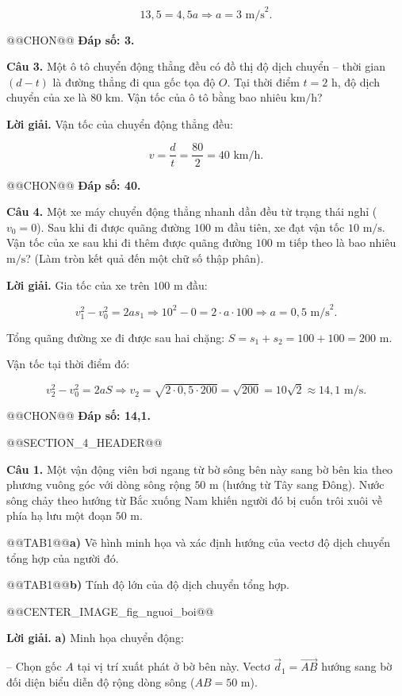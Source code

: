\documentclass{article}
\begin{document}
\[13{,}5 = 4{,}5a \Rightarrow a = 3\text{ m/s}^2.\]

@@CHON@@ \textbf{Đáp số: 3.}

\textbf{Câu 3.} Một ô tô chuyển động thẳng đều có đồ thị độ dịch chuyển -- thời gian $(d - t)$ là đường thẳng đi qua gốc tọa độ $O$. Tại thời điểm $t = 2\text{ h}$, độ dịch chuyển của xe là $80\text{ km}$. Vận tốc của ô tô bằng bao nhiêu $\text{km/h}$?

\textbf{Lời giải.} Vận tốc của chuyển động thẳng đều:

\[v = \frac{d}{t} = \frac{80}{2} = 40\text{ km/h}.\]

@@CHON@@ \textbf{Đáp số: 40.}

\textbf{Câu 4.} Một xe máy chuyển động thẳng nhanh dần đều từ trạng thái nghỉ ($v_0 = 0$). Sau khi đi được quãng đường $100\text{ m}$ đầu tiên, xe đạt vận tốc $10\text{ m/s}$. Vận tốc của xe sau khi đi thêm được quãng đường $100\text{ m}$ tiếp theo là bao nhiêu $\text{m/s}$? (Làm tròn kết quả đến một chữ số thập phân).

\textbf{Lời giải.} Gia tốc của xe trên $100\text{ m}$ đầu:

\[v_1^2 - v_0^2 = 2as_1 \Rightarrow 10^2 - 0 = 2 \cdot a \cdot 100 \Rightarrow a = 0{,}5\text{ m/s}^2.\]

Tổng quãng đường xe đi được sau hai chặng: $S = s_1 + s_2 = 100 + 100 = 200\text{ m}$.

Vận tốc tại thời điểm đó:

\[v_2^2 - v_0^2 = 2aS \Rightarrow v_2 = \sqrt{2 \cdot 0{,}5 \cdot 200} = \sqrt{200} = 10\sqrt{2} \approx 14{,}1\text{ m/s}.\]

@@CHON@@ \textbf{Đáp số: 14,1.}

@@SECTION_4_HEADER@@

\textbf{Câu 1.} Một vận động viên bơi ngang từ bờ sông bên này sang bờ bên kia theo phương vuông góc với dòng sông rộng $50\text{ m}$ (hướng từ Tây sang Đông). Nước sông chảy theo hướng từ Bắc xuống Nam khiến người đó bị cuốn trôi xuôi về phía hạ lưu một đoạn $50\text{ m}$.

@@TAB1@@\textbf{a)} Vẽ hình minh họa và xác định hướng của vectơ độ dịch chuyển tổng hợp của người đó.

@@TAB1@@\textbf{b)} Tính độ lớn của độ dịch chuyển tổng hợp.

@@CENTER_IMAGE_fig_nguoi_boi@@

\textbf{Lời giải.} \textbf{a)} Minh họa chuyển động:

-- Chọn gốc $A$ tại vị trí xuất phát ở bờ bên này. Vectơ $\vec{d}_1 = \vec{AB}$ hướng sang bờ đối diện biểu diễn độ rộng dòng sông ($AB = 50\text{ m}$).
\end{document}
